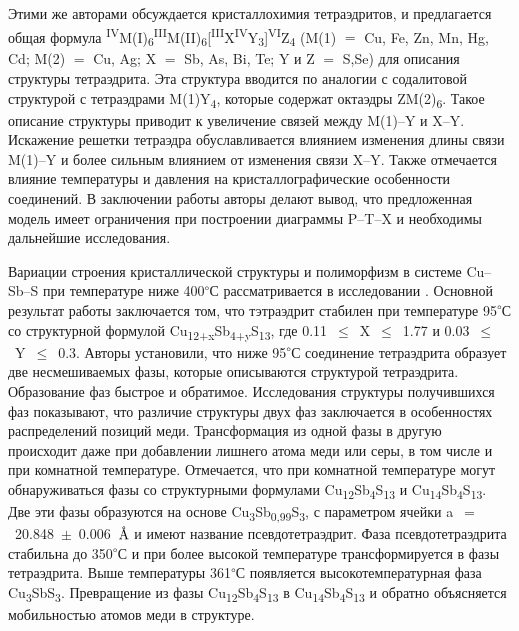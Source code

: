Этими же авторами \cite{Johnson1988} обсуждается кристаллохимия тетраэдритов, и предлагается общая формула \textsuperscript{IV}M(I)\textsubscript{6}\textsuperscript{III}M(II)\textsubscript{6}[\textsuperscript{III}X\textsuperscript{IV}Y\textsubscript{3}]\textsuperscript{VI}Z\textsubscript{4} (M(1) $=$ Cu, Fe, Zn, Mn, Hg, Cd; M(2) $=$ Cu, Ag; X $=$ Sb, As, Bi, Te; Y и Z $=$ S,Se)  для описания структуры тетраэдрита. Эта структура вводится по аналогии с содалитовой структурой с тетраэдрами M(1)Y\textsubscript{4}, которые содержат октаэдры ZM(2)\textsubscript{6}. Такое описание структуры приводит к увеличение связей между M(1)--Y и X--Y. Искажение решетки тетраэдра обуславливается влиянием изменения длины связи M(1)--Y и более сильным влиянием от изменения связи X--Y. Также отмечается влияние температуры и давления на кристаллографические особенности соединений. В заключении работы авторы делают вывод, что предложенная модель имеет ограничения при построении диаграммы P--T--X и необходимы дальнейшие исследования.

Вариации строения кристаллической структуры и полиморфизм в системе Cu--Sb--S при температуре ниже 400\textsuperscript{$\circ$}С рассматривается в исследовании \cite{Tatsuka_1977}. Основной результат работы заключается том, что тэтраэдрит стабилен при температуре 95\textsuperscript{$\circ$}С со структурной формулой Cu\textsubscript{12+x}Sb\textsubscript{4+y}S\textsubscript{13}, где 0.11~$\leqslant$~X~$\leqslant$~1.77 и 0.03~$\leqslant$~Y~$\leqslant$~0.3. Авторы установили, что ниже 95\textsuperscript{$\circ$}С соединение тетраэдрита образует две несмешиваемых фазы, которые описываются структурой тетраэдрита. Образование фаз быстрое и обратимое. Исследования структуры получившихся фаз показывают, что различие структуры двух фаз заключается в особенностях распределений позиций меди. Трансформация из одной фазы в другую происходит даже при добавлении лишнего атома меди или серы, в том числе и при комнатной температуре. Отмечается, что при комнатной температуре могут обнаруживаться фазы со структурными формулами Cu\textsubscript{12}Sb\textsubscript{4}S\textsubscript{13} и Cu\textsubscript{14}Sb\textsubscript{4}S\textsubscript{13}. Две эти фазы образуются на основе Cu\textsubscript{3}Sb\textsubscript{0,99}S\textsubscript{3}, с параметром ячейки a~$=$~20.848~$\pm$~0.006~$\mbox{\normalfont\AA}$ и имеют название псевдотетраэдрит. Фаза псевдотетраэдрита стабильна до 350\textsuperscript{$\circ$}С и при более высокой температуре трансформируется в фазы тетраэдрита. Выше температуры 361\textsuperscript{$\circ$}С появляется высокотемпературная фаза Cu\textsubscript{3}SbS\textsubscript{3}. Превращение из фазы Cu\textsubscript{12}Sb\textsubscript{4}S\textsubscript{13} в Cu\textsubscript{14}Sb\textsubscript{4}S\textsubscript{13} и обратно объясняется мобильностью атомов меди в структуре.

